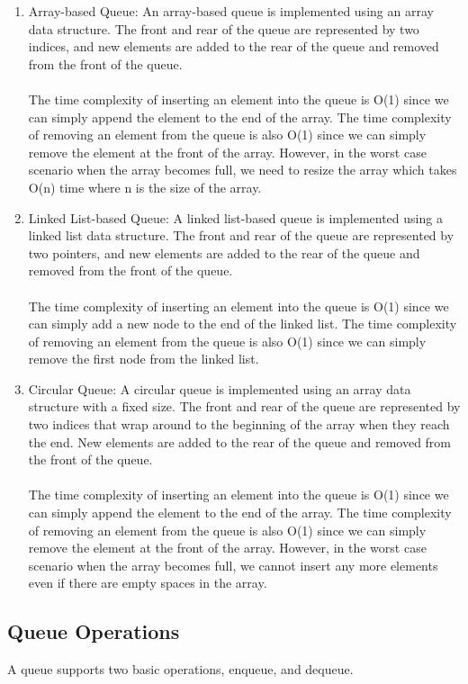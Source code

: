 \documentclass[a4paper, 11pt, oneside]{book} %
\begin{document}
\begin{enumerate}
    \item Array-based Queue:
    An array-based queue is implemented using an array data structure. The front and rear of the queue are represented by two indices, and new elements are added to the rear of the queue and removed from the front of the queue.
    \\
    \\
    The time complexity of inserting an element into the queue is O(1) since we can simply append the element to the end of the array. The time complexity of removing an element from the queue is also O(1) since we can simply remove the element at the front of the array. However, in the worst case scenario when the array becomes full, we need to resize the array which takes O(n) time where n is the size of the array.
    \item Linked List-based Queue:
    A linked list-based queue is implemented using a linked list data structure. The front and rear of the queue are represented by two pointers, and new elements are added to the rear of the queue and removed from the front of the queue.  
    \\
    \\
    The time complexity of inserting an element into the queue is O(1) since we can simply add a new node to the end of the linked list. The time complexity of removing an element from the queue is also O(1) since we can simply remove the first node from the linked list.
    \item Circular Queue:
    A circular queue is implemented using an array data structure with a fixed size. The front and rear of the queue are represented by two indices that wrap around to the beginning of the array when they reach the end. New elements are added to the rear of the queue and removed from the front of the queue.
    \\
    \\
    The time complexity of inserting an element into the queue is O(1) since we can simply append the element to the end of the array. The time complexity of removing an element from the queue is also O(1) since we can simply remove the element at the front of the array. However, in the worst case scenario when the array becomes full, we cannot insert any more elements even if there are empty spaces in the array.            
\end{enumerate}

\subsection{Queue Operations}
A queue supports two basic operations, enqueue, and dequeue.
\end{document}
